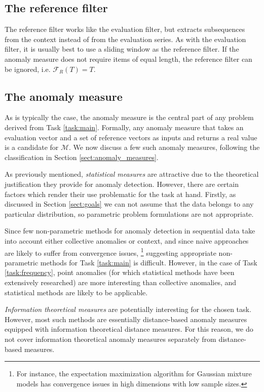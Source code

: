\subsection{The reference filter}

The reference filter works like the evaluation filter, but extracts subsequences from the context instead of from the evaluation series. As with the evaluation filter, it is usually best to use a sliding window as the reference filter. If the anomaly measure does not require items of equal length, the reference filter can be ignored, i.e. $\mathcal{F}_R(T) = T$.

\subsection{The anomaly measure}

As is typically the case, the anomaly measure is the central part of any problem derived from Task \ref{task:main}. Formally, any anomaly measure that takes an evaluation vector and a set of reference vectors as inputs and returns a real value is a candidate for $\mathcal{M}$. We now discuss a few such anomaly measures, following the classification in Section \ref{sect:anomaly_measures}.

As previously mentioned, \emph{statistical measures} are attractive due to the theoretical justification they provide for anomaly detection. However, there are certain factors which render their use problematic for the task at hand. Firstly, as discussed in Section \ref{sect:goals} we can not assume that the data belongs to any particular distribution, so parametric problem formulations are not appropriate. 

Since few non-parametric methods for anomaly detection in sequential data take into account either collective anomalies or context, and since naive approaches are likely to suffer from convergence issues, \footnote{For instance, the expectation maximization algorithm for Gaussian mixture models has convergence issues in high dimensions with low sample sizes.} suggesting appropriate non-parametric methods for Task \ref{task:main} is difficult. However, in the case of Task \ref{task:frequency}, point anomalies (for which statistical methods have been extensively researched) are more interesting than collective anomalies, and statistical methods are likely to be applicable.

\emph{Information theoretical measures} are potentially interesting for the chosen task. However, most such methods are essentially distance-based anomaly measures equipped with information theoretical distance measures. For this reason, we do not cover information theoretical anomaly measures separately from distance-based measures.

